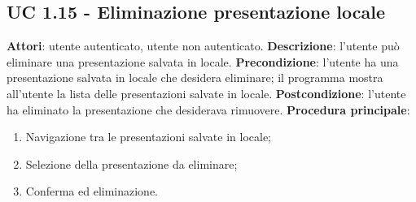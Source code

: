 \subsection{UC 1.15 - Eliminazione presentazione locale}{
	\label{uc1.15}
	\textbf{Attori}: utente autenticato, utente non autenticato.
	\textbf{Descrizione}: l'utente può eliminare una presentazione salvata in locale.
	\textbf{Precondizione}: l'utente ha una presentazione salvata in locale che desidera eliminare; il programma mostra all'utente la lista delle presentazioni salvate in locale.
	\textbf{Postcondizione}: l'utente ha eliminato la presentazione che desiderava rimuovere.
	\textbf{Procedura principale}:
	\begin{enumerate}
		\item Navigazione tra le presentazioni salvate in locale;
		\item Selezione della presentazione da eliminare;
		\item Conferma ed eliminazione.
	\end{enumerate}
}